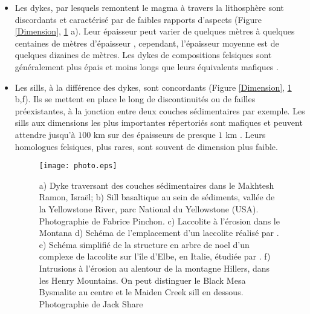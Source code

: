 \begin{itemize}
\item  Les  dykes,  par  lesquels  remontent le  magma  à  travers  la
  lithosphère sont discordants et  caractérisé par de faibles rapports
  d'aspects (Figure \ref{Dimension}, \ref{picture} a).  Leur épaisseur
  peut  varier  de quelques  mètres  à  quelques centaines  de  mètres
  d'épaisseur      \citep{Walker:1989jq,Rubin:1995upa},     cependant,
  l'épaisseur moyenne est de quelques dizaines de mètres. Les dykes de
  compositions felsiques  sont généralement plus épais  et moins longs
  que leurs équivalents mafiques \citep{Rubin:1995upa}.

\item Les sills,  à la différence des dykes,  sont concordants (Figure
  \ref{Dimension},  \ref{picture} b,f).   Ils se  mettent en  place le
  long de  discontinuités ou de  failles préexistantes, à  la jonction
  entre  deux  couches  sédimentaires  par  exemple.   Les  sills  aux
  dimensions les plus importantes répertoriés sont mafiques et peuvent
  attendre  jusqu'à $100$  km sur  des  épaisseurs de  presque $1$  km
  \citep{Cruden:tg}.   Leurs homologues  felsiques,  plus rares,  sont
  souvent de dimension plus faible.

  \begin{figure}[htpb]
    \begin{center}
      \graphicspath{ {/Users/thorey/Documents/These/Manuscript/Figure/Chapter1/} }
      \texttt{[image: photo.eps]}
      \caption{a) Dyke  traversant des  couches sédimentaires  dans le
        Makhtesh  Ramon,  Israël;  b)   Sill  basaltique  au  sein  de
        sédiments, vallée  de la  Yellowstone River, parc  National du
        Yellowstone  (USA).   Photographie  de  Fabrice  Pinchon.   c)
        Laccolite   à  l'érosion   dans  le   Montana  d)   Schéma  de
        l'emplacement       d'un      laccolite       réalisé      par
        \citet{Gilbert:1877uk}. e) Schéma simplifié de la structure en
        arbre de noel d'un complexe  de laccolite sur l'île d'Elbe, en
        Italie,  étudiée par  \citet{Rocchi:2010dn}.  f)  Intrusions à
        l'érosion au alentour  de la montagne Hillers,  dans les Henry
        Mountains.   On peut  distinguer  le Black  Mesa Bysmalite  au
        centre et  le Maiden Creek  sill en dessous.   Photographie de
        Jack Share}
      \label{picture}
    \end{center}
  \end{figure}


\end{itemize}
